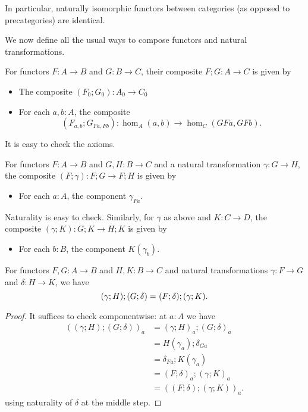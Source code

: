 In particular, naturally isomorphic functors between categories (as opposed to precategories) are identical.

\medskip

We now define all the usual ways to compose functors and natural transformations.

\begin{defn}
  For functors $F:A\to B$ and $G:B\to C$, their composite $F;G:A\to C$ is given by
  \begin{itemize}
  \item The composite $(F_0;G_0) : A_0 \to C_0$
  \item For each $a,b:A$, the composite
    \[(F_{a,b};G_{Fa,Fb}):\hom_A(a,b) \to \hom_C(GFa,GFb).\]
  \end{itemize}
  It is easy to check the axioms.
\end{defn}

\begin{defn}
  For functors $F:A\to B$ and $G,H:B\to C$ and a natural transformation $\gamma:G\to H$, the composite $(F;\gamma):F;G\to F;H$ is given by
  \begin{itemize}
  \item For each $a:A$, the component $\gamma_{Fa}$.
  \end{itemize}
  Naturality is easy to check.  Similarly, for $\gamma$ as above and $K:C\to D$, the composite $(\gamma;K):G;K\to H;K$ is given by
  \begin{itemize}
  \item For each $b:B$, the component $K(\gamma_b)$.
  \end{itemize}
\end{defn}

\begin{lem}\label{ct:interchange}
  For functors $F,G:A\to B$ and $H,K:B\to C$ and natural transformations $\gamma:F\to G$ and $\delta:H\to K$, we have
  \[(\gamma;H);(G;\delta) =_{} (F;\delta);(\gamma;K).\]
\end{lem}
\begin{proof}
  It suffices to check componentwise: at $a:A$ we have
  \begin{align*}
    ((\gamma;H);(G;\delta))_a
    &= (\gamma;H)_a ; (G;\delta)_{a}\\
    &= H(\gamma_a) ; \delta_{Ga}\\
    &= \delta_{Fa} ; K(\gamma_a)\\
    &= (F;\delta)_a ; (\gamma;K)_a\\
    &= ((F;\delta);(\gamma;K))_a.
  \end{align*}
  using naturality of $\delta$ at the middle step.
\end{proof}

